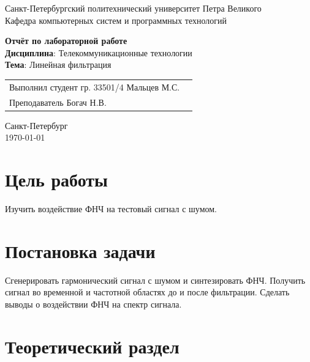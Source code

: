 \documentclass[a4paper,14pt]{extarticle}
\begin{document}
\begin{titlepage}
\centering
Санкт-Петербургский политехнический университет Петра Великого \\
\vspace{0.15cm}
Кафедра компьютерных систем и программных технологий \\
\vspace{6.5cm}

{\centering \textbf{Отчёт по лабораторной работе} \\ 
\vspace{0.15cm}
\textbf{Дисциплина}: Телекоммуникационные технологии \\
\vspace{0.15cm}
\textbf{Тема}: Линейная фильтрация} \\


\vspace{6.5cm}

\begin{table}[H]
\begin{tabular}{p{\textwidth}@{}r}
{Выполнил студент гр. 33501/4} \hfill {Мальцев  М.С.} \\
{Преподаватель} \hfill {Богач Н.В.} \\
\end{tabular}
\end{table}
\vfill

{\centering Санкт-Петербург \\ 
\vspace{0.15cm}
\today}
\end{titlepage}

\tableofcontents
\newpage

\section{Цель работы}

Изучить воздействие ФНЧ на тестовый сигнал с шумом.

\section{Постановка задачи}

Сгенерировать гармонический сигнал с шумом
и синтезировать ФНЧ. Получить сигнал во временной и частотной областях до и после фильтрации. Сделать выводы о воздействии ФНЧ на спектр сигнала.

\section{Теоретический раздел}
\end{document}
